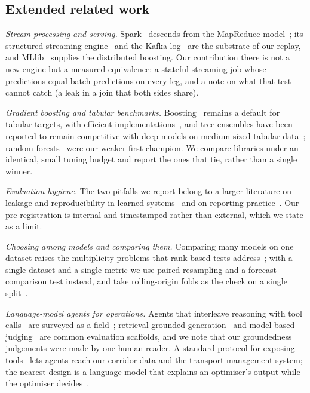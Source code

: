 \subsection{Extended related work}\label{sec:related_ext}

\textit{Stream processing and serving.} Spark~\cite{zaharia2016apache,zaharia2012resilient} descends from the MapReduce model~\cite{dean2008mapreduce}; its structured-streaming engine~\cite{armbrust2018structured} and the Kafka log~\cite{kreps2011kafka} are the substrate of our replay, and MLlib~\cite{meng2016mllib} supplies the distributed boosting. Our contribution there is not a new engine but a measured equivalence: a stateful streaming job whose predictions equal batch predictions on every leg, and a note on what that test cannot catch (a leak in a join that both sides share).

\textit{Gradient boosting and tabular benchmarks.} Boosting~\cite{friedman2001greedy} remains a default for tabular targets, with efficient implementations~\cite{chen2016xgboost,ke2017lightgbm,prokhorenkova2018catboost}, and tree ensembles have been reported to remain competitive with deep models on medium-sized tabular data~\cite{grinsztajn2022why}; random forests~\cite{breiman2001random} were our weaker first champion. We compare libraries under an identical, small tuning budget and report the ones that tie, rather than a single winner.

\textit{Evaluation hygiene.} The two pitfalls we report belong to a larger literature on leakage and reproducibility in learned systems~\cite{kaufman2012leakage,kapoor2023leakage} and on reporting practice~\cite{pineau2021improving,arp2022dos}. Our pre-registration is internal and timestamped rather than external, which we state as a limit.

\textit{Choosing among models and comparing them.} Comparing many models on one dataset raises the multiplicity problems that rank-based tests address~\cite{demsar2006statistical}; with a single dataset and a single metric we use paired resampling and a forecast-comparison test instead, and take rolling-origin folds as the check on a single split~\cite{tashman2000out,bergmeir2012use,hyndman2006another}.

\textit{Language-model agents for operations.} Agents that interleave reasoning with tool calls~\cite{yao2023react,schick2023toolformer,wei2022chain} are surveyed as a field~\cite{wang2024survey,xi2023rise}; retrieval-grounded generation~\cite{lewis2020retrieval} and model-based judging~\cite{zheng2023judging} are common evaluation scaffolds, and we note that our groundedness judgements were made by one human reader. A standard protocol for exposing tools~\cite{mcp2025specification} lets agents reach our corridor data and the transport-management system; the nearest design is a language model that explains an optimiser's output while the optimiser decides~\cite{li2023optiguide}.

